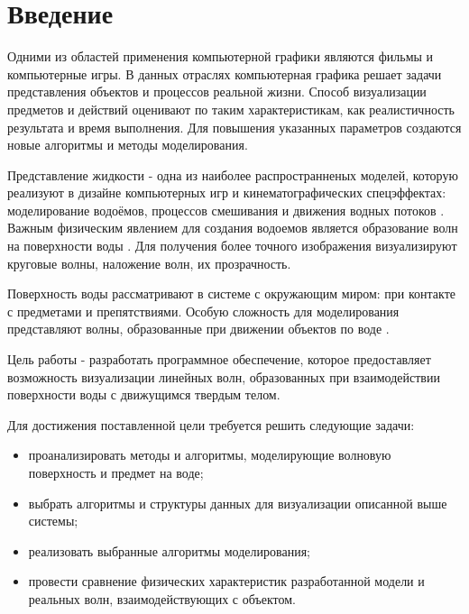 \chapter*{Введение}

Одними из областей применения компьютерной графики являются  фильмы и компьютерные игры. В данных отраслях компьютерная графика решает задачи представления объектов и процессов реальной жизни. Способ визуализации предметов и действий оценивают по таким характеристикам, как реалистичность результата и время выполнения. Для повышения указанных параметров создаются новые алгоритмы и методы моделирования.

Представление жидкости - одна из наиболее распространненых моделей, которую реализуют в дизайне компьютерных игр и кинематографических спецэффектах: моделирование водоёмов, процессов смешивания и движения водных потоков \cite{large-water-bodies}. Важным физическим явлением для создания водоемов является образование волн на поверхности воды \cite{ocean-simulation}. Для получения более точного изображения визуализируют круговые волны, наложение волн, их прозрачность.

Поверхность воды рассматривают в системе с окружающим миром: при контакте с предметами и препятствиями. Особую сложность для моделирования представляют волны, образованные при движении объектов по воде \cite{dispersion-kernels}.

Цель работы - разработать программное обеспечение, которое предоставляет возможность визуализации линейных волн, образованных при взаимодействии поверхности воды с движущимся твердым телом.

Для достижения поставленной цели требуется решить следующие задачи:

\begin{itemize}
	\item проанализировать методы и алгоритмы, моделирующие волновую поверхность и предмет на воде; 
	\item выбрать алгоритмы и структуры данных для визуализации описанной выше системы; 
	\item реализовать выбранные алгоритмы моделирования;
	\item провести сравнение физических характеристик разработанной модели и реальных волн, взаимодействующих с объектом.
\end{itemize}
